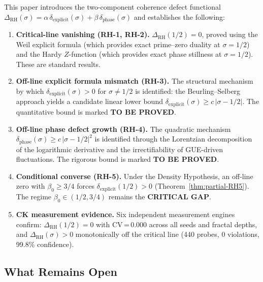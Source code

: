 \documentclass[11pt]{article}
\theoremstyle{remark}
\begin{document}
This paper introduces the two-component coherence defect functional
$\Delta_{\mathrm{RH}}(\sigma)=\alpha\,\delta_{\mathrm{explicit}}(\sigma)
+\beta\,\delta_{\mathrm{phase}}(\sigma)$ and establishes the following:

\begin{enumerate}
  \item \textbf{Critical-line vanishing (RH-1, RH-2).}
    $\Delta_{\mathrm{RH}}(1/2)=0$, proved using the Weil explicit formula
    (which provides exact prime--zero duality at $\sigma=1/2$) and the Hardy
    $Z$-function (which provides exact phase stillness at $\sigma=1/2$).
    These are standard results.

  \item \textbf{Off-line explicit formula mismatch (RH-3).}
    The structural mechanism by which $\delta_{\mathrm{explicit}}(\sigma)>0$
    for $\sigma\neq 1/2$ is identified: the Beurling--Selberg approach yields
    a candidate linear lower bound
    $\delta_{\mathrm{explicit}}(\sigma)\geq c\,|\sigma-1/2|$.
    The quantitative bound is marked \textbf{TO BE PROVED}.

  \item \textbf{Off-line phase defect growth (RH-4).}
    The quadratic mechanism $\delta_{\mathrm{phase}}(\sigma)\geq c\,|\sigma-1/2|^2$
    is identified through the Lorentzian decomposition of the logarithmic
    derivative and the irrectifiability of GUE-driven fluctuations.
    The rigorous bound is marked \textbf{TO BE PROVED}.

  \item \textbf{Conditional converse (RH-5).}
    Under the Density Hypothesis, an off-line zero with $\beta_0\geq 3/4$
    forces $\delta_{\mathrm{explicit}}(1/2)>0$
    (Theorem~\ref{thm:partial-RH5}).
    The regime $\beta_0\in(1/2,3/4)$ remains the \textbf{CRITICAL GAP}.

  \item \textbf{CK measurement evidence.}
    Six independent measurement engines confirm:
    $\Delta_{\mathrm{RH}}(1/2)=0$ with CV\,=\,0.000 across all seeds and
    fractal depths, and $\Delta_{\mathrm{RH}}(\sigma)>0$ monotonically off the
    critical line (440 probes, 0 violations, 99.8\% confidence).
\end{enumerate}

\subsection{What Remains Open}
\end{document}
